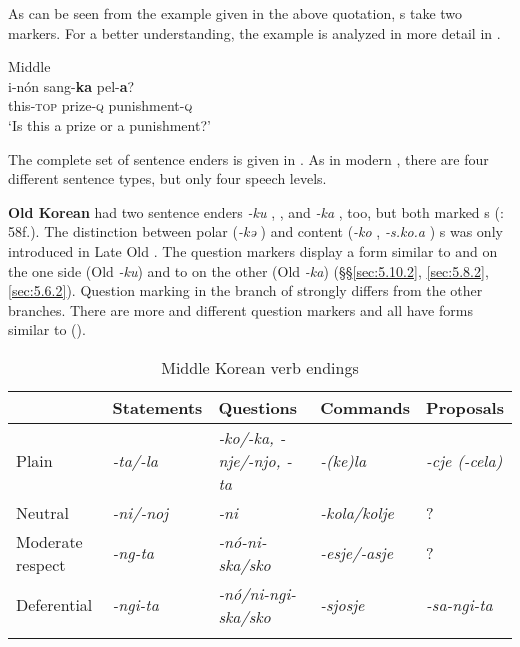 As can be seen from the example given in the above quotation, s take two  markers. For a better understanding, the example is analyzed in more detail in .

\ea%
    \label{ex:kore:25}
    Middle \\
    \gll i-nón    sang-\textbf{{ka}} pel-\textbf{{a}}?\\
    this-\textsc{top}  prize-\textsc{q}    punishment-\textsc{q}\\
    \glt ‘Is this a prize or a punishment?’ \citep[102]{Sohn2012}
    \z

The complete set of  sentence enders is given in . As in modern , there are four different sentence types, but only four speech levels.

\textbf{Old Korean} had two  sentence enders \textit{-ku} , ,  and \textit{-ka} , too, but both marked s (\citealt{Nam2012}: 58f.). The distinction between polar (\textit{-kə} ) and content (\textit{-ko} , \textit{-s.ko.a} ) s was only introduced in Late Old  \citep[66]{Nam2012}. The  question markers display a form similar to  and  on the one side (Old  \textit{-ku}) and to  on the other (Old  \textit{-ka}) (§§\ref{sec:5.10.2}, \ref{sec:5.8.2}, \ref{sec:5.6.2}). Question marking in the  branch of  strongly differs from the other branches. There are more and different question markers and all have forms similar to  ().

\begin{table}
\caption{Middle Korean verb endings \citep[449]{Sohn2015}}
\label{tab:kore:6}

\begin{tabularx}{\textwidth}{Xllll}
\lsptoprule
& \textbf{Statements} & \textbf{Questions} & \textbf{Commands} & \textbf{Proposals}\\
\midrule
Plain & \textit{-ta/-la} & \textit{-ko/-ka, -nje/-njo, -ta} & \textit{-(ke)la} & \textit{-cje (-cela)}\\
Neutral & \textit{-ni/-noj} & \textit{-ni} & \textit{-kola/kolje} & ?\\
Moderate respect & \textit{-ng-ta} & \textit{-nó-ni-ska/sko} & \textit{-esje/-asje} & ?\\
Deferential & \textit{-ngi-ta} & \textit{-nó/ni-ngi-ska/sko} & \textit{-sjosje} & \textit{-sa-ngi-ta}\\
\lspbottomrule
\end{tabularx}
\end{table}

